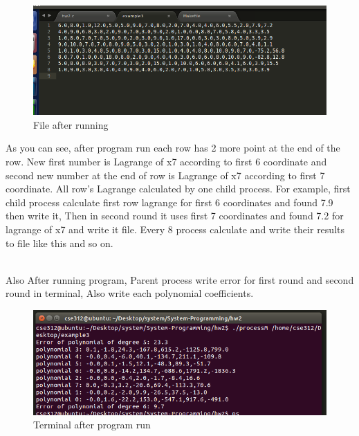 \documentclass{article}
\begin{document}
\begin{figure}[h!]
\centering
\includegraphics[scale=0.5]{ss2.png}
\caption{File after running}
\label{fig:ss2.png}
\end{figure}
As you can see, after program run each row has 2 more point at the end of the row. New first number is Lagrange of x7 according to first 6 coordinate and second new number at the end of row is Lagrange of x7 according to first 7 coordinate. All row's Lagrange calculated by one child process. For example, first child process calculate first row lagrange for first 6 coordinates and found 7.9 then write it, Then in second round it uses first 7 coordinates and found 7.2 for lagrange of x7 and write it file. Every 8 process calculate and write their results to file like this and so on.

\\
Also After running program, Parent process write error for first round and second round in terminal, Also write each polynomial coefficients.
\\

\begin{figure}[h!]
\centering
\includegraphics[scale=0.5]{ss3.png}
\caption{Terminal after program run}
\label{fig:ss3.png}
\end{figure}
\end{document}

